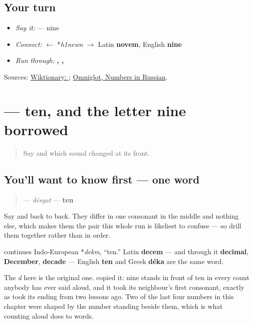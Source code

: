 \subsection*{Your turn}
\begin{itemize}
\raggedright
  \item \emph{Say it:} \textbf{} — nine
  \item \emph{Connect:} \textbf{} $\leftarrow$ *\emph{h1newn} $\to$ Latin \textbf{novem}, English \textbf{nine}
  \item \emph{Run through:} \textbf{, , }
\end{itemize}

\begin{tcolorbox}[breakable,colback=teal!4,colframe=teal!35!black,title={Before you move on}]
Sources: \href{https://en.wiktionary.org/wiki/\%D0\%B4\%D0\%B5\%D0\%B2\%D1\%8F\%D1\%82\%D1\%8C}{Wiktionary: }; \href{https://www.omniglot.com/language/numbers/russian.htm}{Omniglot, Numbers in Russian}.
\end{tcolorbox}
\section[\texorpdfstring{\ru{десять} (désyat)}{десять (désyat)}]{ — ten, and the letter nine borrowed}

\label{lesson:RU-C24-desyat}



\begin{quote}
Say \textbf{} and which sound changed at its front.
\end{quote}

\subsection*{You'll want to know first — one word}
\begin{quote}
\textbf{} — \emph{désyat} — \textbf{ten}
\end{quote}

Say \textbf{} and \textbf{} back to back. They differ in one consonant in the middle and nothing else, which makes them the pair this whole run is likeliest to confuse — so drill them together rather than in order.

\begin{cousinweb}
\textbf{} continues Indo-European *\emph{dekm}, \textquotedblleft{}ten.\textquotedblright{} Latin \textbf{decem} — and through it \textbf{decimal}, \textbf{December}, \textbf{decade} — English \textbf{ten} and Greek \textbf{déka} are the same word.

The \emph{d} here is the original one. \textbf{} copied it: nine stands in front of ten in every count anybody has ever said aloud, and it took its neighbour's first consonant, exactly as \textbf{} took its ending from \textbf{} two lessons ago. Two of the last four numbers in this chapter were shaped by the number standing beside them, which is what counting aloud does to words.
\end{cousinweb}

